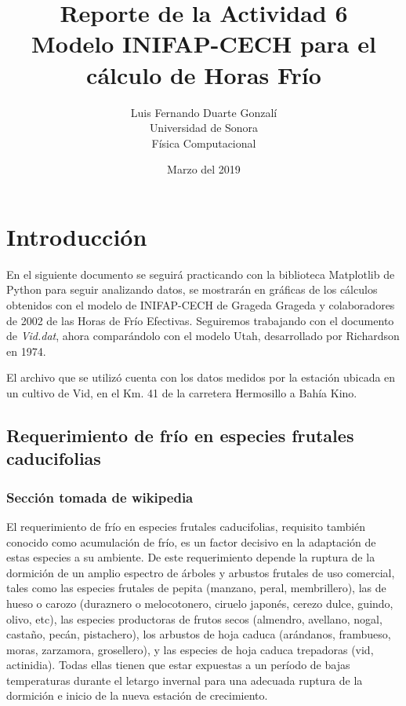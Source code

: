 \documentclass{article}
\title{\textbf{Reporte de la Actividad 6}\\ Modelo INIFAP-CECH para el cálculo de Horas Frío}
\author{Luis Fernando Duarte Gonzalí \\ Universidad de Sonora \\ Física Computacional}
\date{Marzo del 2019}
\begin{document}
\maketitle


\section{Introducción}

\noindent En el siguiente documento se seguirá practicando con la biblioteca Matplotlib de Python para seguir analizando datos, se mostrarán en gráficas de los cálculos obtenidos con el modelo de INIFAP-CECH de Grageda Grageda y colaboradores de 2002 de las Horas de Frío Efectivas. Seguiremos trabajando con el documento de \textit{Vid.dat}, ahora comparándolo con el modelo Utah, desarrollado por Richardson en 1974.

El archivo que se utilizó cuenta con los datos medidos por la estación ubicada en un cultivo de Vid, en el Km. 41 de la carretera Hermosillo a Bahía Kino.

\subsection{Requerimiento de frío en especies frutales caducifolias}

\subsubsection*{Sección tomada de wikipedia}

El requerimiento de frío en especies frutales caducifolias, requisito también conocido como acumulación de frío, es un factor decisivo en la adaptación de estas especies a su ambiente. De este requerimiento depende la ruptura de la dormición de un amplio espectro de árboles y arbustos frutales de uso comercial, tales como las especies frutales de pepita (manzano, peral, membrillero), las de hueso o carozo (duraznero o melocotonero, ciruelo japonés, cerezo dulce, guindo, olivo, etc), las especies productoras de frutos secos (almendro, avellano, nogal, castaño, pecán, pistachero), los arbustos de hoja caduca (arándanos, frambueso, moras, zarzamora, grosellero), y las especies de hoja caduca trepadoras (vid, actinidia). Todas ellas tienen que estar expuestas a un período de bajas temperaturas durante el letargo invernal para una adecuada ruptura de la dormición e inicio de la nueva estación de crecimiento.
\end{document}
